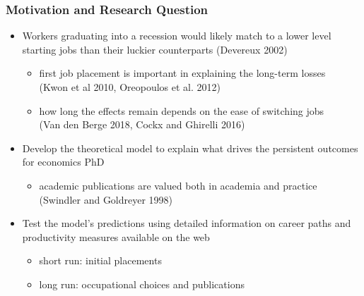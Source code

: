 \documentclass[10pt,svgnames,fragile]{beamer}
\begin{document}
\begin{frame}
	\frametitle{Motivation and Research Question} 
	\begin{itemize}
		
		\item Workers graduating into a recession would likely match to a lower level starting jobs than their luckier counterparts (Devereux 2002)
		\begin{itemize}
			\item first job placement is important in explaining the long-term losses\\ (Kwon et al 2010, Oreopoulos et al. 2012)
			\vspace{1 mm}
			\item how long the effects remain depends on the ease of switching jobs \\(Van den Berge 2018, Cockx and Ghirelli 2016)
		\end{itemize}
		\vspace{1.5 mm}
		\item Develop the theoretical model to explain what drives the persistent outcomes for economics PhD
		\begin{itemize}
			\item academic publications are valued both in academia and practice\\ (Swindler and Goldreyer 1998)
		\end{itemize}
		\vspace{1.5 mm}
		\item Test the model's predictions using detailed information on career paths and productivity measures  available on the web
		\begin{itemize}
			\item short run: initial placements
			\vspace{1 mm}
			\item long run: occupational choices and publications 
		\end{itemize}
	\end{itemize}
\end{frame}
\end{document}
